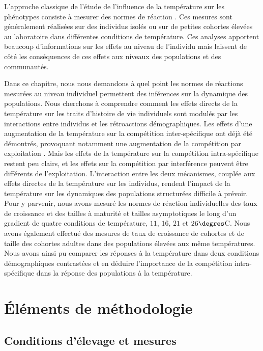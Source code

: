 L'approche classique de l'étude de l'influence de la température sur les
phénotypes consiste à mesurer des normes de réaction \autocites{woltereck1909a}.
Ces mesures sont généralement réalisées sur des individus isolés ou sur de
petites cohortes élevées au laboratoire dans différentes conditions de
température. Ces analyses apportent beaucoup d'informations sur les effets au
niveau de l'individu mais laissent de côté les conséquences de ces effets aux
niveaux des populations et des communautés. 

Dans ce chapitre, nous nous demandons à quel point les normes de réactions
mesurées au niveau individuel permettent des inférences sur la dynamique des
populations. Nous cherchons à comprendre comment les effets directs de la
température sur les traits d'histoire de vie individuels sont modulés par les
interactions entre individus et les rétroactions démographiques.
Les effets d'une augmentation de la température sur la compétition
inter-spécifique ont déjà été démontrés, provoquant notamment une augmentation
de la compétition par exploitation \autocites{ohlberger2011a}. Mais les effets
de la température sur la compétition intra-spécifique restent peu clairs, et les
effets sur la compétition par interférence peuvent être différents de
l'exploitation. L'interaction entre les deux mécanismes, couplée aux effets
directes de la température sur les individus, rendent l'impact de la température
sur les dynamiques des populations structurées difficile à prévoir. Pour y
parvenir, nous avons mesuré les normes de réaction individuelles des taux de
croissance et des tailles à maturité et tailles asymptotiques le long d'un
gradient de quatre conditions de température, $11$, $16$, $21$ et $26\degres$C.
Nous avons également effectué des mesures de taux de croissance de cohortes et de taille
des cohortes adultes dans des populations élevées aux même températures. Nous
avons ainsi pu comparer les réponses à la température dans deux conditions
démographiques contrastées et en déduire l'importance de la compétition
intra-spécifique dans la réponse des populations à la température.

\section{Éléments de méthodologie}

\subsection{Conditions d'élevage et mesures}

